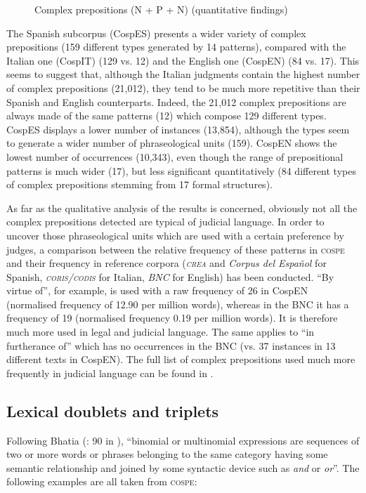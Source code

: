 \documentclass[output=paper]{LSP/langsci}
\begin{document}
\begin{figure}

\caption{Complex prepositions (N + P + N) (quantitative findings)} \label{fig:6:1}
\end{figure}

The Spanish subcorpus (CospES) presents a wider variety of complex prepositions (159 different types generated by 14 patterns), compared with the Italian one (CospIT) (129 vs. 12) and the English one (CospEN) (84 vs. 17). This seems to suggest that, although the Italian judgments contain the highest number of complex prepositions (21,012), they tend to be much more repetitive than their Spanish and English counterparts. Indeed, the 21,012 complex prepositions are always made of the same patterns (12) which compose 129 different types. CospES displays a lower number of instances (13,854), although the types seem to generate a wider number of phraseological units (159). CospEN shows the lowest number of occurrences (10,343), even though the range of prepositional patterns is much wider (17), but less significant quantitatively (84 different types of complex prepositions stemming from 17 formal structures).

As far as the qualitative analysis of the results is concerned, obviously not all the complex prepositions detected are typical of judicial language. In order to uncover those phraseological units which are used with a certain preference by judges, a comparison between the relative frequency of these patterns in \textsc{cospe} and their frequency in reference corpora (\textit{\textsc{crea}} and \textit{Corpus del Español} for Spanish, \textit{\textsc{coris}/\textsc{codis}} for Italian, \textit{BNC} for English) has been conducted. “By virtue of”, for example, is used with a raw frequency of 26 in CospEN (normalised frequency of 12.90 per million words), whereas in the BNC it has a frequency of 19 (normalised frequency 0.19 per million words). It is therefore much more used in legal and judicial language. The same applies to “in furtherance of” which has no occurrences in the BNC (vs. 37 instances in 13 different texts in CospEN). The full list of complex prepositions used much more frequently in judicial language can be found in \citet[200-205]{Pontrandolfo2013b}.

\subsection{Lexical doublets and triplets}
Following Bhatia (\citeyear{Bhatia1984}: 90 in \citealt[108]{Bhatia1993}), “binomial or multinomial expressions are sequences of two or more words or phrases belonging to the same category having some semantic relationship and joined by some syntactic device such as \textit{and} or \textit{or}”. The following examples are all taken from \textsc{cospe}:
\end{document}
